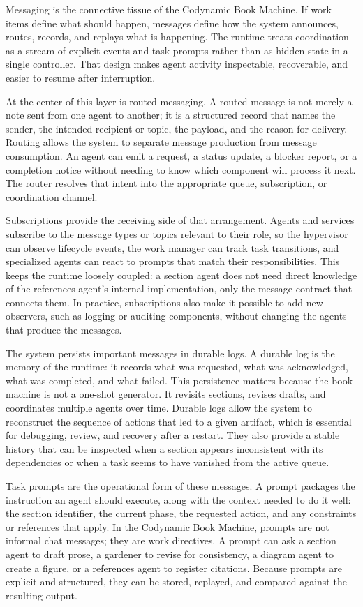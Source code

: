 Messaging is the connective tissue of the Codynamic Book Machine. If work items define what should happen, messages define how the system announces, routes, records, and replays what is happening. The runtime treats coordination as a stream of explicit events and task prompts rather than as hidden state in a single controller. That design makes agent activity inspectable, recoverable, and easier to resume after interruption.

At the center of this layer is routed messaging. A routed message is not merely a note sent from one agent to another; it is a structured record that names the sender, the intended recipient or topic, the payload, and the reason for delivery. Routing allows the system to separate message production from message consumption. An agent can emit a request, a status update, a blocker report, or a completion notice without needing to know which component will process it next. The router resolves that intent into the appropriate queue, subscription, or coordination channel.

Subscriptions provide the receiving side of that arrangement. Agents and services subscribe to the message types or topics relevant to their role, so the hypervisor can observe lifecycle events, the work manager can track task transitions, and specialized agents can react to prompts that match their responsibilities. This keeps the runtime loosely coupled: a section agent does not need direct knowledge of the references agent's internal implementation, only the message contract that connects them. In practice, subscriptions also make it possible to add new observers, such as logging or auditing components, without changing the agents that produce the messages.

The system persists important messages in durable logs. A durable log is the memory of the runtime: it records what was requested, what was acknowledged, what was completed, and what failed. This persistence matters because the book machine is not a one-shot generator. It revisits sections, revises drafts, and coordinates multiple agents over time. Durable logs allow the system to reconstruct the sequence of actions that led to a given artifact, which is essential for debugging, review, and recovery after a restart. They also provide a stable history that can be inspected when a section appears inconsistent with its dependencies or when a task seems to have vanished from the active queue.

Task prompts are the operational form of these messages. A prompt packages the instruction an agent should execute, along with the context needed to do it well: the section identifier, the current phase, the requested action, and any constraints or references that apply. In the Codynamic Book Machine, prompts are not informal chat messages; they are work directives. A prompt can ask a section agent to draft prose, a gardener to revise for consistency, a diagram agent to create a figure, or a references agent to register citations. Because prompts are explicit and structured, they can be stored, replayed, and compared against the resulting output.

